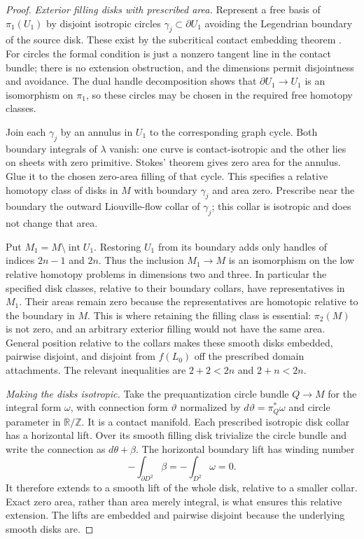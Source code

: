 \documentclass[11pt]{article}
\numberwithin{equation}{section}
\theoremstyle{definition}
\theoremstyle{remark}
\newcommand{\R}{\mathbb R}
\newcommand{\Z}{\mathbb Z}
\begin{document}
\begin{proof}
\emph{Exterior filling disks with prescribed area.}
Represent a free basis of $\pi_1(U_1)$ by disjoint isotropic
circles $\gamma_j\subset\partial U_1$ avoiding the Legendrian
boundary of the source disk.  These exist by the subcritical
contact embedding theorem \cite[Theorem~12.4.1]{Top:EMbook}.
For circles the formal condition is just a nonzero tangent line
in the contact bundle; there is no extension obstruction, and
the dimensions permit disjointness and avoidance.  The dual
handle decomposition shows that
$\partial U_1\to U_1$ is an isomorphism on $\pi_1$, so these
circles may be chosen in the required free homotopy classes.

Join each $\gamma_j$ by an annulus in $U_1$ to the corresponding
graph cycle.  Both boundary integrals of $\lambda$ vanish:
one curve is contact-isotropic and the other lies on sheets with
zero primitive.  Stokes' theorem gives zero area for the
annulus.  Glue it to the chosen zero-area filling of that cycle.
This specifies a relative homotopy class of disks in $M$ with
boundary $\gamma_j$ and area zero.  Prescribe near the boundary
the outward Liouville-flow collar of $\gamma_j$; this collar is
isotropic and does not change that area.

Put $M_1=M\setminus\operatorname{int}U_1$.  Restoring $U_1$
from its boundary adds only handles of indices $2n-1$ and
$2n$.  Thus the inclusion $M_1\to M$ is an isomorphism on the
low relative homotopy problems in dimensions two and three.
In particular the specified disk classes, relative to their
boundary collars, have representatives in $M_1$.  Their areas
remain zero because the representatives are homotopic relative
to the boundary in $M$.  This is where retaining the filling
class is essential: $\pi_2(M)$ is not zero, and an arbitrary
exterior filling would not have the same area.
General position relative to the collars makes these smooth
disks embedded, pairwise disjoint, and disjoint from $f(L_0)$
off the prescribed domain attachments.  The relevant
inequalities are $2+2<2n$ and $2+n<2n$.

\emph{Making the disks isotropic.}
Take the prequantization circle bundle $Q\to M$ for the
integral form $\omega$, with connection form $\vartheta$
normalized by $d\vartheta=\pi_Q^*\omega$ and circle parameter
in $\R/\Z$.  It is a contact manifold.  Each prescribed
isotropic disk collar has a horizontal lift.  Over its smooth
filling disk trivialize the circle bundle and write the
connection as $d\theta+\beta$.  The horizontal boundary lift
has winding number
\begin{equation}\label{top:eq:zero-winding}
       -\int_{\partial D^2}\beta=-\int_{D^2}\omega=0.
\end{equation}
It therefore extends to a smooth lift of the whole disk,
relative to a smaller collar.  Exact zero area, rather than
area merely integral, is what ensures this relative extension.
The lifts are embedded and pairwise disjoint because the
underlying smooth disks are.


\end{proof}
\end{document}
